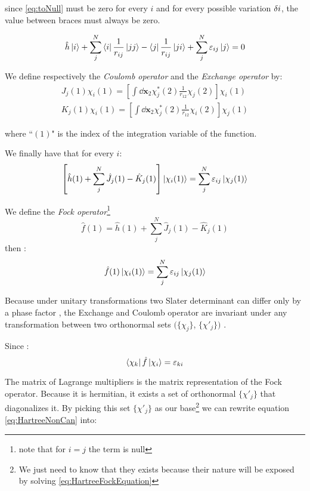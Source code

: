 \documentclass[a4paper,12pt]{article}
\begin{document}
since \eqref{eq:toNull} must be zero for every $i$ and for every possible variation $\var{i}$, the value between braces must  always be zero.

\begin{equation}
	\hat{h}  \ket{i} + \sum_{j}^{N}  \bra{i} \frac{1}{r_{ij}} \ket{j j } - \bra{ j } \frac{1}{r_{ij}} \ket{j i} + \sum_{j}^{N} \varepsilon_{ij} \ket{j} = 0
\end{equation}

We define respectively the \textit{Coulomb operator} and the \textit{Exchange operator} by:
\begin{align}
	J_{j}(1) \chi_{i}(1) = \left[  \int \dd \mathbf{x}_{2} \chi_{j}^{*}(2) \frac{1}{r_{12}} \chi_{j}(2) \right] \chi_i(1) \label{eq:coulombOperator} \\
	K_{j}(1) \chi_{i}(1) = \left[  \int \dd \mathbf{x}_{2} \chi_{j}^{*}(2) \frac{1}{r_{12}} \chi_{i}(2) \right] \chi_j(1)	
\label{eq:exchangeOperator}
\end{align}

where ``$(1)$" is the index of the integration variable of the function.

We finally have that for every $i$:
\begin{align}
	\left[ \hat{h}(1) + \sum_{j}^{N} \hat{J}_{j}(1) - \hat{K}_{j}(1) \right] \ket{\chi_i(1)} = \sum_{j}^{N} \varepsilon_{ij} \ket{\chi_{j}(1)} \label{eq:HartreeNonCan}
\end{align}

We define the \textit{Fock operator}\footnote{note that for $i=j$ the term is null}
\begin{equation}\label{eq:FockOperator}
	\hat{f}(1) = \hat{h}(1) + \sum_{j}^{N} \hat{J}_{j}(1) - \hat{K}_{j}(1)
\end{equation}
then :
\begin{align}
	\hat{f}(1)\ket{\chi_i(1)} = \sum_{j}^{N} \varepsilon_{ij} \ket{\chi_{j}(1)} 
\end{align}


Because under unitary transformations two Slater determinant can differ only by a phase factor \cite[p.120]{Attila}, the Exchange and Coulomb operator are invariant under any transformation between two orthonormal sets $(\{\chi_j\}$, $\{\chi'_j\})$ .

Since :
\begin{equation}
	\bra{\chi_k}\hat{f}\ket{\chi_i} = \varepsilon_{ki}
\end{equation}

The matrix of Lagrange multipliers is the matrix representation of the Fock operator.
Because it is hermitian, it exists a set of orthonormal $\{\chi'_j\}$ that diagonalizes it.
By picking this set $\{\chi'_j\}$ as our base\footnote{We just need to know that they exists because their nature will be exposed by solving \eqref{eq:HartreeFockEquation}} we can rewrite equation \eqref{eq:HartreeNonCan} into:
\end{document}
